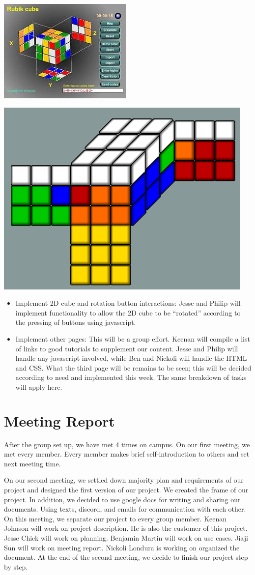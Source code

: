 \documentclass[12pt]{article}
\begin{document}
\par
  \includegraphics[width = .4\textwidth]{rubiks1.PNG}

  \includegraphics[width = .4\textwidth]{rubiks2.PNG}
  
\begin{itemize}
\item Implement 2D cube and rotation button interactions: Jesse and Philip will implement functionality to allow the 2D cube to be “rotated” according to the pressing of buttons using javascript.
\item Implement other pages: This will be a group effort. Keenan will compile a list of links to good tutorials to supplement our content. Jesse and Philip will handle any javascript involved, while Ben and Nickoli will handle the HTML and CSS. What the third page will be remains to be seen; this will be decided according to need and implemented this week. The same breakdown of tasks will apply here.
\end{itemize}



\section{Meeting Report}
\par
After the group set up, we have met 4 times on campus.  On our first meeting, we met every member. Every member makes brief self-introduction to others and set next meeting time. \\

\par
On our second meeting, we settled down majority plan and requirements of our project and designed the first version of our project. We created the frame of our project. In addition, we decided to use google docs for writing and sharing our documents. Using texts, discord, and emails for communication with each other. On this meeting, we separate our project to every group member. Keenan Johnson will work on project description. He is also the customer of this project. Jesse Chick will work on planning. Benjamin Martin will work on use cases. Jiaji Sun will work on meeting report. Nickoli Londura is working on organized the document. At the end of the second meeting, we decide to finish our project step by step. \\
\end{document}
